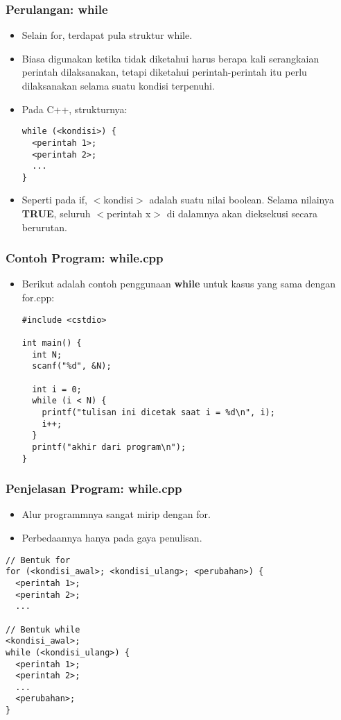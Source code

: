 \begin{frame}[fragile]
\frametitle{Perulangan: while}
\begin{itemize}
  \item Selain for, terdapat pula struktur while.
  \item Biasa digunakan ketika tidak diketahui harus berapa kali serangkaian perintah dilaksanakan, tetapi diketahui perintah-perintah itu perlu dilaksanakan selama suatu kondisi terpenuhi.
  \item Pada C++, strukturnya:
\begin{lstlisting}
while (<kondisi>) {
  <perintah 1>;
  <perintah 2>;
  ...
}
\end{lstlisting}
  \item Seperti pada if, $<$kondisi$>$ adalah suatu nilai boolean. Selama nilainya \textbf{TRUE}, seluruh $<$perintah x$>$ di dalamnya akan dieksekusi secara berurutan.
\end{itemize}
\end{frame}

\begin{frame}[fragile]
\frametitle{Contoh Program: while.cpp}
\begin{itemize}
  \item Berikut adalah contoh penggunaan \textbf{while} untuk kasus yang sama dengan for.cpp:
\begin{lstlisting}
#include <cstdio>

int main() {
  int N;
  scanf("%d", &N);

  int i = 0;
  while (i < N) {
    printf("tulisan ini dicetak saat i = %d\n", i);
    i++;
  }
  printf("akhir dari program\n");
}
\end{lstlisting}
\end{itemize}
\end{frame}

\begin{frame}[fragile]
\frametitle{Penjelasan Program: while.cpp}
\begin{itemize}
  \item Alur programmnya sangat mirip dengan for.
  \item Perbedaannya hanya pada gaya penulisan.
\end{itemize}
\begin{lstlisting}
// Bentuk for
for (<kondisi_awal>; <kondisi_ulang>; <perubahan>) {
  <perintah 1>;
  <perintah 2>;
  ...

// Bentuk while
<kondisi_awal>;
while (<kondisi_ulang>) {
  <perintah 1>;
  <perintah 2>;
  ...
  <perubahan>;
}
\end{lstlisting}

\end{frame}

